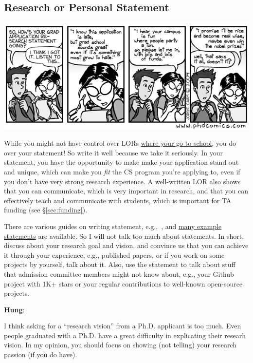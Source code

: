 \documentclass[11pt]{article}
\newenvironment{commentbox}[1][]{
\small
    \begin{cbox}
    \textbf{#1}: 
 }{
   \end{cbox}
}
\begin{document}
\subsection{Research or Personal Statement}\label{sec:research-statement}


    \begin{center}
      \includegraphics[scale=0.5]{c2.png}
    \end{center}

While you might not have control over LORs \hyperref[sec:your-school]{where your go to school}, you do over your
statement! So write it well because we take it seriously.
In your statement, you have the opportunity to make  make your application stand out and unique, which can make you \emph{fit} the CS program you're applying to, even if you don't have very strong research experience.
A well-written LOR also shows that you can communicate, which is very important in research, and that you can effectively teach and communicate with students, which is important for TA funding (see \S\ref{sec:funding}).

There are various guides on writing statement, e.g.,~\cite{blattman2022writing}, and \href{https://cs-sop.org/}{many example statements} are available. So I will not talk too much about statements. In short, discuss about your research goal and vision, and convince us that you can achieve it through your experience, e.g., published papers, or if you work on some projects by yourself, talk about it. Also, use the statement to talk about stuff that admission committee members might not know about, e.g., your Github project with 1K+ stars or  your regular contributions to well-known open-source projects.

\begin{commentbox}[Hung]
I think asking for a “research vision” from a Ph.D. applicant is too much. Even people graduated with a Ph.D. have a great difficulty in explicating their researh vision. In my opinion, you should focus on showing (not telling) your research passion (if you do have).
\end{commentbox}
\end{document}
